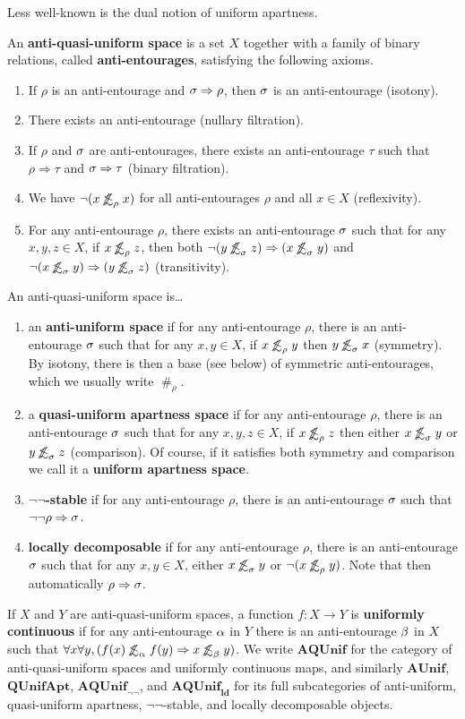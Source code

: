 \documentclass{article}
\def\apart{\mathrel{\#}}
\def\oapt{\mathrel{\!\not\,\not\lesssim}}
\def\aent#1{\oapt_{#1}}
\let\implies\Rightarrow
\def\nn{\ensuremath{\neg\neg}}
\def\AUnif{\mathbf{AUnif}}
\def\AQUnifnn{\mathbf{AQUnif}_{\nn}}
\def\AQUnif{\mathbf{AQUnif}}
\def\QUnifApt{\mathbf{QUnifApt}}
\def\ldAQUnif{\mathbf{AQUnif}_{\mathbf{ld}}}
\begin{document}
Less well-known is the dual notion of uniform apartness.

\begin{defn}
  An \textbf{anti-quasi-uniform space} is a set $X$ together with a family of binary relations, called \textbf{anti-entourages}, satisfying the following axioms.
  \begin{enumerate}
  \item If $\rho$ is an anti-entourage and $\si\implies\rho$, then $\sigma$ is an anti-entourage (isotony).
  \item There exists an anti-entourage (nullary filtration).
  \item If $\rho$ and $\sigma$ are anti-entourages, there exists an anti-entourage $\tau$ such that $\rho\implies\tau$ and $\si\implies\tau$ (binary filtration).
  \item We have $\neg(x\aent\rho x)$ for all anti-entourages $\rho$ and all $x\in X$ (reflexivity).
  \item For any anti-entourage $\rho$, there exists an anti-entourage $\sigma$ such that for any $x,y,z\in X$, if $x\aent\rho z$, then both $\neg(y\aent\si z)\implies (x\aent\si y)$ and $\neg(x\aent\si y)\implies (y\aent\si z)$ (transitivity).
  \end{enumerate}
  An anti-quasi-uniform space is\dots
  \begin{enumerate}[resume]
  \item an \textbf{anti-uniform space} if for any anti-entourage $\rho$, there is an anti-entourage $\sigma$ such that for any $x,y\in X$, if $x\aent\rho y$ then $y\aent\si x$ (symmetry).
    By isotony, there is then a base (see below) of symmetric anti-entourages, which we usually write $\apart_\rho$.
  \item a \textbf{quasi-uniform apartness space} if for any anti-entourage $\rho$, there is an anti-entourage $\sigma$ such that for any $x,y,z\in X$, if $x\aent\rho z$ then either $x\aent\si y$ or $y\aent\si z$ (comparison).
    Of course, if it satisfies both symmetry and comparison we call it a \textbf{uniform apartness space}.
  \item \textbf{\nn-stable} if for any anti-entourage $\rho$, there is an anti-entourage $\sigma$ such that $\neg\neg\rho \implies \si$.
  \item \textbf{locally decomposable} if for any anti-entourage $\rho$, there is an anti-entourage $\sigma$ such that for any $x,y\in X$, either $x\aent\si y$ or $\neg(x\aent\rho y)$.
    Note that then automatically $\rho\implies\si$.
  \end{enumerate}
  If $X$ and $Y$ are anti-quasi-uniform spaces, a function $f:X\to Y$ is \textbf{uniformly continuous} if for any anti-entourage $\alpha$ in $Y$ there is an anti-entourage $\beta$ in $X$ such that $\forall x\forall y, (f(x)\aent\al f(y) \implies x\aent\be y)$.
  We write $\AQUnif$ for the category of anti-quasi-uniform spaces and uniformly continuous maps, and similarly $\AUnif$, $\QUnifApt$, $\AQUnifnn$, and $\ldAQUnif$ for its full subcategories of anti-uniform, quasi-uniform apartness, \nn-stable, and locally decomposable objects.
\end{defn}
\end{document}
